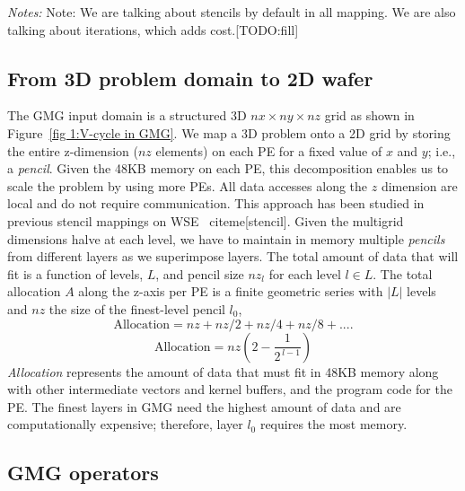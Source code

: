 \documentclass[sigconf]{acmart}
\begin{document}
\begin{table}[t]
        \textit{Notes:} 
        Note: We are talking about stencils by default in all mapping.  We are also talking about iterations, which adds cost.[TODO:fill]
        \end{table}

    \subsection{From 3D problem domain to 2D wafer}
    The GMG input domain is a structured 3D \(nx \times ny \times nz\) grid as shown in Figure~\ref{fig 1:V-cycle in GMG}. We map a 3D problem onto a 2D grid by storing the entire z-dimension ($nz$ elements) on each PE for a fixed value of $x$ and $y$; i.e., a \textit{pencil}. Given the 48KB memory on each PE, this decomposition enables us to scale the problem by using more PEs. All data accesses along the $z$ dimension are local and do not require communication. This approach has been studied in previous stencil mappings on WSE~\cite{Rocki,Sai,sai2,mathias} citeme[stencil]. Given the multigrid dimensions halve at each level, we have to maintain in memory multiple \textit{pencils} from different layers as we superimpose layers. The total amount of data that will fit is a function of levels, $L$, and pencil size $nz_l$ for each level $l \in L$. The total allocation $A$ along the z-axis per PE is a finite geometric series with $|L|$ levels and $nz$ the size of the finest-level pencil $l_0$, 
    \[
    \text{Allocation} = nz + nz/2  + nz/4  + nz/8 + ....
    \]
    \[
    \text{Allocation} = nz \left( 2 - \frac{1}{2^{\,l-1}} \right)
    \]
    \textit{Allocation} represents the amount of data that must fit in 48KB memory along with other intermediate vectors and kernel buffers, and the program code for the PE.
    The finest layers in GMG need the highest amount of data and are computationally expensive; therefore, layer $l_0$ requires the most memory.
    \subsection{GMG operators}
\end{document}
